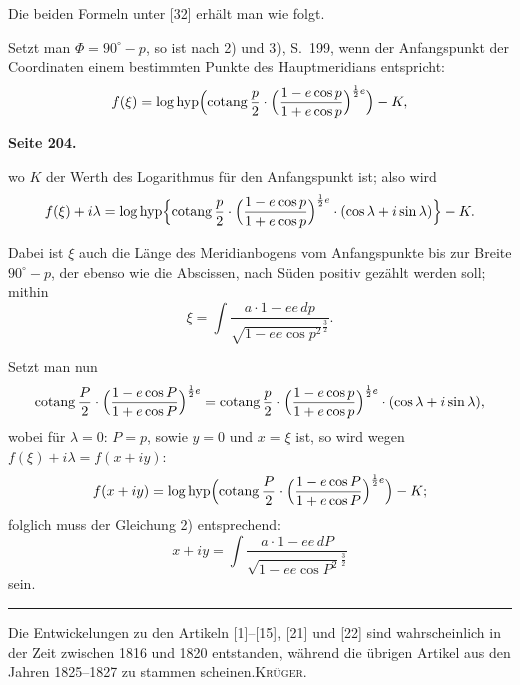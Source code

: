 \documentclass[12pt,a4paper]{article}
\theoremstyle{plain}
\theoremstyle{definition}
\theoremstyle{remark}
\begin{document}
Die beiden Formeln unter [32] erhält man wie folgt.

Setzt man $\Phi = 90^{\circ} - p$, so ist nach 2) und 3), S.~199, wenn der Anfangspunkt der Coordinaten einem bestimmten Punkte des Hauptmeridians entspricht:
\begin{equation}
f(\xi) = \log \mathrm{hyp} \Bigl(\mathrm{cotang}\, \frac{p}{2} \cdot \Bigl(\frac{1 - e\cos p}{1 + e\cos p}\Bigr)^{\frac{1}{2}e}\Bigr) - K,
\end{equation}

\newpage
\textbf{Seite 204.}

wo $K$ der Werth des Logarithmus für den Anfangspunkt ist; also wird
\[
f(\xi) + i\lambda = \log \mathrm{hyp} \Bigl\{\mathrm{cotang}\, \frac{p}{2} \cdot \Bigl(\frac{1 - e\cos p}{1 + e\cos p}\Bigr)^{\frac{1}{2}e} \cdot (\cos \lambda + i\sin \lambda)\Bigr\} - K.
\]

Dabei ist $\xi$ auch die Länge des Meridianbogens vom Anfangspunkte bis zur Breite $90^{\circ} - p$, der ebenso wie die Abscissen, nach Süden positiv gezählt werden soll; mithin
\begin{equation}
\xi = \int \frac{a \cdot 1 - ee \, dp}{\sqrt{1 - ee \cos p^2}^{\frac{3}{2}}}.
\end{equation}

Setzt man nun
\begin{equation}
\mathrm{cotang}\, \frac{P}{2} \cdot \Bigl(\frac{1 - e\cos P}{1 + e\cos P}\Bigr)^{\frac{1}{2}e} = \mathrm{cotang}\, \frac{p}{2} \cdot \Bigl(\frac{1 - e\cos p}{1 + e\cos p}\Bigr)^{\frac{1}{2}e} \cdot (\cos \lambda + i\sin \lambda),
\end{equation}
wobei für $\lambda = 0$: $P = p$, sowie $y = 0$ und $x = \xi$ ist, so wird wegen $f(\xi) + i\lambda = f(x + iy)$:
\begin{equation}
f(x + iy) = \log \mathrm{hyp} \Bigl(\mathrm{cotang}\, \frac{P}{2} \cdot \Bigl(\frac{1 - e\cos P}{1 + e\cos P}\Bigr)^{\frac{1}{2}e}\Bigr) - K;
\end{equation}
folglich muss der Gleichung 2) entsprechend:
\begin{equation}
x + iy = \int \frac{a \cdot 1 - ee \, dP}{\sqrt{1 - ee \cos P^2}^{\frac{3}{2}}}
\end{equation}
sein.

\medskip
\hrule
\medskip

Die Entwickelungen zu den Artikeln [1]--[15], [21] und [22] sind wahrscheinlich in der Zeit zwischen 1816 und 1820 entstanden, während die übrigen Artikel aus den Jahren 1825--1827 zu stammen scheinen.\hfill\textsc{Krüger.}
\end{document}
